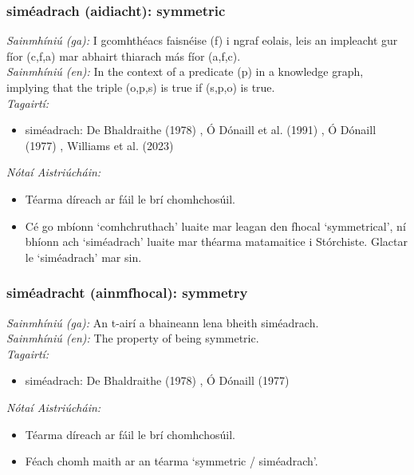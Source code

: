 \subsubsection*{siméadrach (aidiacht): symmetric}
 \noindent \textit{Sainmhíniú (ga):} I gcomhthéacs faisnéise (f) i ngraf eolais, leis an impleacht gur fíor (c,f,a) mar abhairt thiarach más fíor (a,f,c).
\\
 \noindent \textit{Sainmhíniú (en):} In the context of a predicate (p) in a knowledge graph, implying that the triple (o,p,s) is true if (s,p,o) is true.
\\
 \noindent \textit{Tagairtí:}
\begin{itemize}
	\item siméadrach: De Bhaldraithe (1978) \cite{de-bhaldraithe}, Ó Dónaill et al. (1991) \cite{focloir-beag}, Ó Dónaill (1977) \cite{odonaill}, Williams et al. (2023) \cite{storchiste}
\end{itemize}

 \noindent \textit{Nótaí Aistriúcháin:}
\begin{itemize}
	\item Téarma díreach ar fáil le brí chomhchosúil.
	\item Cé go mbíonn `comhchruthach' luaite mar leagan den fhocal `symmetrical', ní bhíonn ach `siméadrach' luaite mar théarma matamaitice i Stórchiste. Glactar le `siméadrach' mar sin.
\end{itemize}


\subsubsection*{siméadracht (ainmfhocal): symmetry}
 \noindent \textit{Sainmhíniú (ga):} An t-airí a bhaineann lena bheith siméadrach.
\\
 \noindent \textit{Sainmhíniú (en):} The property of being symmetric.
\\
 \noindent \textit{Tagairtí:}
\begin{itemize}
	\item siméadrach: De Bhaldraithe (1978) \cite{de-bhaldraithe}, Ó Dónaill (1977) \cite{odonaill}
\end{itemize}

 \noindent \textit{Nótaí Aistriúcháin:}
\begin{itemize}
	\item Téarma díreach ar fáil le brí chomhchosúil.
	\item Féach chomh maith ar an téarma `symmetric / siméadrach'.
\end{itemize}


